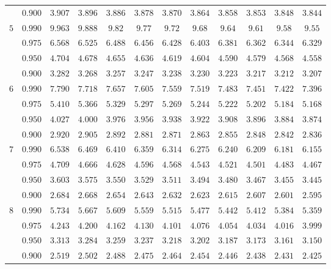 \documentclass[11pt]{article}
\theoremstyle{definition}
\begin{document}
\begin{table}[H]
\begin{tabularx}{\linewidth}{c | c | c c c c c c c c c c}
		& $0.900$ & $3.907$ & $3.896$ & $3.886$ & $3.878$ & $3.870$ & $3.864$ & $3.858$ & $3.853$ & $3.848$ & $3.844$ \\
		$5$ & $0.990$ & $9.963$ & $9.888$ & $9.82$ & $9.77$ & $9.72$ & $9.68$ & $9.64$ & $9.61$ & $9.58$ & $9.55$ \\
		& $0.975$ & $6.568$ & $6.525$ & $6.488$ & $6.456$ & $6.428$ & $6.403$ & $6.381$ & $6.362$ & $6.344$ & $6.329$ \\
		& $0.950$ & $4.704$ & $4.678$ & $4.655$ & $4.636$ & $4.619$ & $4.604$ & $4.590$ & $4.579$ & $4.568$ & $4.558$ \\
		& $0.900$ & $3.282$ & $3.268$ & $3.257$ & $3.247$ & $3.238$ & $3.230$ & $3.223$ & $3.217$ & $3.212$ & $3.207$ \\
		$6$ & $0.990$ & $7.790$ & $7.718$ & $7.657$ & $7.605$ & $7.559$ & $7.519$ & $7.483$ & $7.451$ & $7.422$ & $7.396$ \\
		& $0.975$ & $5.410$ & $5.366$ & $5.329$ & $5.297$ & $5.269$ & $5.244$ & $5.222$ & $5.202$ & $5.184$ & $5.168$ \\
		& $0.950$ & $4.027$ & $4.000$ & $3.976$ & $3.956$ & $3.938$ & $3.922$ & $3.908$ & $3.896$ & $3.884$ & $3.874$ \\
		& $0.900$ & $2.920$ & $2.905$ & $2.892$ & $2.881$ & $2.871$ & $2.863$ & $2.855$ & $2.848$ & $2.842$ & $2.836$ \\
		$7$ & $0.990$ & $6.538$ & $6.469$ & $6.410$ & $6.359$ & $6.314$ & $6.275$ & $6.240$ & $6.209$ & $6.181$ & $6.155$ \\
		& $0.975$ & $4.709$ & $4.666$ & $4.628$ & $4.596$ & $4.568$ & $4.543$ & $4.521$ & $4.501$ & $4.483$ & $4.467$ \\
		& $0.950$ & $3.603$ & $3.575$ & $3.550$ & $3.529$ & $3.511$ & $3.494$ & $3.480$ & $3.467$ & $3.455$ & $3.445$ \\
		& $0.900$ & $2.684$ & $2.668$ & $2.654$ & $2.643$ & $2.632$ & $2.623$ & $2.615$ & $2.607$ & $2.601$ & $2.595$ \\
		$8$ & $0.990$ & $5.734$ & $5.667$ & $5.609$ & $5.559$ & $5.515$ & $5.477$ & $5.442$ & $5.412$ & $5.384$ & $5.359$ \\
		& $0.975$ & $4.243$ & $4.200$ & $4.162$ & $4.130$ & $4.101$ & $4.076$ & $4.054$ & $4.034$ & $4.016$ & $3.999$ \\
		& $0.950$ & $3.313$ & $3.284$ & $3.259$ & $3.237$ & $3.218$ & $3.202$ & $3.187$ & $3.173$ & $3.161$ & $3.150$ \\
		& $0.900$ & $2.519$ & $2.502$ & $2.488$ & $2.475$ & $2.464$ & $2.454$ & $2.446$ & $2.438$ & $2.431$ & $2.425$ \\

\end{tabularx}
\end{table}
\end{document}
